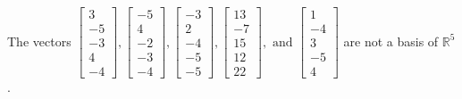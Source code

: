 \begin{exercise}
\begin{exerciseStatement}
  \end{exerciseStatement}
  \begin{exerciseAnswer}
   The vectors \(\left[\begin{array}{r}
3 \\
-5 \\
-3 \\
4 \\
-4
\end{array}\right] , \left[\begin{array}{r}
-5 \\
4 \\
-2 \\
-3 \\
-4
\end{array}\right] , \left[\begin{array}{r}
-3 \\
2 \\
-4 \\
-5 \\
-5
\end{array}\right] , \left[\begin{array}{r}
13 \\
-7 \\
15 \\
12 \\
22
\end{array}\right] , \text{ and } \left[\begin{array}{r}
1 \\
-4 \\
3 \\
-5 \\
4
\end{array}\right]\) 
  	 are not  a basis of \(\mathbb{R}^5\).
  


  \end{exerciseAnswer}
\end{exercise}